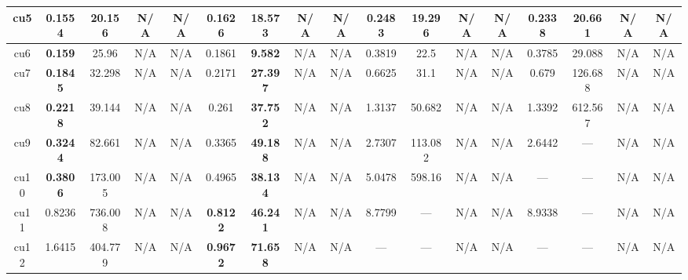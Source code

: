 \begin{tabular}{||c||c|c|c|c||c|c|c|c||c|c|c|c||c|c|c|c||}
\hline%
cu5&\small{\textbf{0.1554}}&\small{20.156}&\small{N/A}&\small{N/A}&\small{0.1626}&\small{\textbf{18.573}}&\small{N/A}&\small{N/A}&\small{0.2483}&\small{19.296}&\small{N/A}&\small{N/A}&\small{0.2338}&\small{20.661}&\small{N/A}&\small{N/A}\\%
\hline%
cu6&\small{\textbf{0.159}}&\small{25.96}&\small{N/A}&\small{N/A}&\small{0.1861}&\small{\textbf{9.582}}&\small{N/A}&\small{N/A}&\small{0.3819}&\small{22.5}&\small{N/A}&\small{N/A}&\small{0.3785}&\small{29.088}&\small{N/A}&\small{N/A}\\%
\hline%
cu7&\small{\textbf{0.1845}}&\small{32.298}&\small{N/A}&\small{N/A}&\small{0.2171}&\small{\textbf{27.397}}&\small{N/A}&\small{N/A}&\small{0.6625}&\small{31.1}&\small{N/A}&\small{N/A}&\small{0.679}&\small{126.688}&\small{N/A}&\small{N/A}\\%
\hline%
cu8&\small{\textbf{0.2218}}&\small{39.144}&\small{N/A}&\small{N/A}&\small{0.261}&\small{\textbf{37.752}}&\small{N/A}&\small{N/A}&\small{1.3137}&\small{50.682}&\small{N/A}&\small{N/A}&\small{1.3392}&\small{612.567}&\small{N/A}&\small{N/A}\\%
\hline%
cu9&\small{\textbf{0.3244}}&\small{82.661}&\small{N/A}&\small{N/A}&\small{0.3365}&\small{\textbf{49.188}}&\small{N/A}&\small{N/A}&\small{2.7307}&\small{113.082}&\small{N/A}&\small{N/A}&\small{2.6442}&\small{---}&\small{N/A}&\small{N/A}\\%
\hline%
cu10&\small{\textbf{0.3806}}&\small{173.005}&\small{N/A}&\small{N/A}&\small{0.4965}&\small{\textbf{38.134}}&\small{N/A}&\small{N/A}&\small{5.0478}&\small{598.16}&\small{N/A}&\small{N/A}&\small{---}&\small{---}&\small{N/A}&\small{N/A}\\%
\hline%
cu11&\small{0.8236}&\small{736.008}&\small{N/A}&\small{N/A}&\small{\textbf{0.8122}}&\small{\textbf{46.241}}&\small{N/A}&\small{N/A}&\small{8.7799}&\small{---}&\small{N/A}&\small{N/A}&\small{8.9338}&\small{---}&\small{N/A}&\small{N/A}\\%
\hline%
cu12&\small{1.6415}&\small{404.779}&\small{N/A}&\small{N/A}&\small{\textbf{0.9672}}&\small{\textbf{71.658}}&\small{N/A}&\small{N/A}&\small{---}&\small{---}&\small{N/A}&\small{N/A}&\small{---}&\small{---}&\small{N/A}&\small{N/A}\\%
\hline%
\end{tabular}